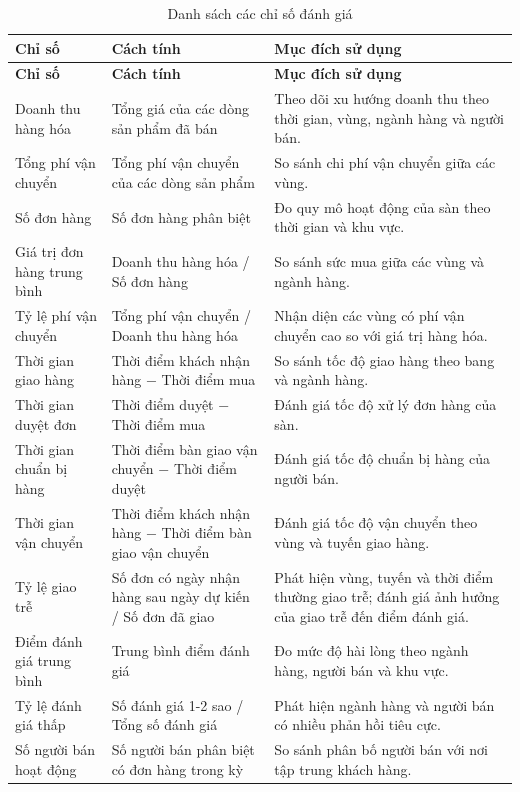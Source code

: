 \begingroup\small{}
\begin{longtable}{|P{3.4cm}|P{5.3cm}|P{5.3cm}|}
\caption{Danh sách các chỉ số đánh giá}\label{tab:kpi}\\
\hline
\textbf{Chỉ số} & \textbf{Cách tính} & \textbf{Mục đích sử dụng}\\ \hline \endfirsthead
\hline
\textbf{Chỉ số} & \textbf{Cách tính} & \textbf{Mục đích sử dụng}\\ \hline \endhead
Doanh thu hàng hóa & Tổng giá của các dòng sản phẩm đã bán & Theo dõi xu hướng doanh thu theo thời gian, vùng, ngành hàng và người bán.\\ \hline
Tổng phí vận chuyển & Tổng phí vận chuyển của các dòng sản phẩm & So sánh chi phí vận chuyển giữa các vùng.\\ \hline
Số đơn hàng & Số đơn hàng phân biệt & Đo quy mô hoạt động của sàn theo thời gian và khu vực.\\ \hline
Giá trị đơn hàng trung bình & Doanh thu hàng hóa / Số đơn hàng & So sánh sức mua giữa các vùng và ngành hàng.\\ \hline
Tỷ lệ phí vận chuyển & Tổng phí vận chuyển / Doanh thu hàng hóa & Nhận diện các vùng có phí vận chuyển cao so với giá trị hàng hóa.\\ \hline
Thời gian giao hàng & Thời điểm khách nhận hàng $-$ Thời điểm mua & So sánh tốc độ giao hàng theo bang và ngành hàng.\\ \hline
Thời gian duyệt đơn & Thời điểm duyệt $-$ Thời điểm mua & Đánh giá tốc độ xử lý đơn hàng của sàn.\\ \hline
Thời gian chuẩn bị hàng & Thời điểm bàn giao vận chuyển $-$ Thời điểm duyệt & Đánh giá tốc độ chuẩn bị hàng của người bán.\\ \hline
Thời gian vận chuyển & Thời điểm khách nhận hàng $-$ Thời điểm bàn giao vận chuyển & Đánh giá tốc độ vận chuyển theo vùng và tuyến giao hàng.\\ \hline
Tỷ lệ giao trễ & Số đơn có ngày nhận hàng sau ngày dự kiến / Số đơn đã giao & Phát hiện vùng, tuyến và thời điểm thường giao trễ; đánh giá ảnh hưởng của giao trễ đến điểm đánh giá.\\ \hline
Điểm đánh giá trung bình & Trung bình điểm đánh giá & Đo mức độ hài lòng theo ngành hàng, người bán và khu vực.\\ \hline
Tỷ lệ đánh giá thấp & Số đánh giá 1-2 sao / Tổng số đánh giá & Phát hiện ngành hàng và người bán có nhiều phản hồi tiêu cực.\\ \hline
Số người bán hoạt động & Số người bán phân biệt có đơn hàng trong kỳ & So sánh phân bố người bán với nơi tập trung khách hàng.\\ \hline
\end{longtable}
\endgroup


